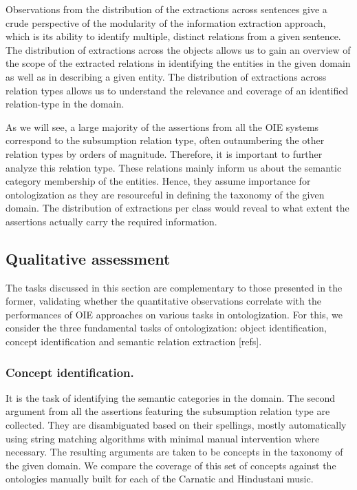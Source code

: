 \documentclass{llncs}
\begin{document}
Observations from the distribution of the extractions across sentences give a crude perspective of the modularity of the information extraction approach, which is its ability to identify multiple, distinct relations from a given sentence. The distribution of extractions across the objects allows us to gain an overview of the scope of the extracted relations in identifying the entities in the given domain as well as in describing a given entity. The distribution of extractions across relation types allows us to understand the relevance and coverage of an identified relation-type in the domain. 

As we will see, a large majority of the assertions from all the OIE systems correspond to the subsumption relation type, often outnumbering the other relation types by orders of magnitude. Therefore, it is important to further analyze this relation type. These relations mainly inform us about the semantic category membership of the entities. Hence, they assume importance for ontologization as they are resourceful in defining the taxonomy of the given domain. The distribution of extractions per class would reveal to what extent the assertions actually carry the required information.

\subsection{Qualitative assessment}
The tasks discussed in this section are complementary to those presented in the former, validating whether the quantitative observations correlate with the performances of OIE approaches on various tasks in ontologization. For this, we consider the three fundamental tasks of ontologization: object identification, concept identification and semantic relation extraction [refs]. 

\subsubsection{Concept identification.} It is the task of identifying the semantic categories in the domain. The second argument from all the assertions featuring the subsumption relation type are collected. They are disambiguated based on their spellings, mostly automatically using string matching algorithms with minimal manual intervention where necessary. The resulting arguments are taken to be concepts in the taxonomy of the given domain. We compare the coverage of this set of concepts against the ontologies manually built for each of the Carnatic and Hindustani music.
\end{document}
